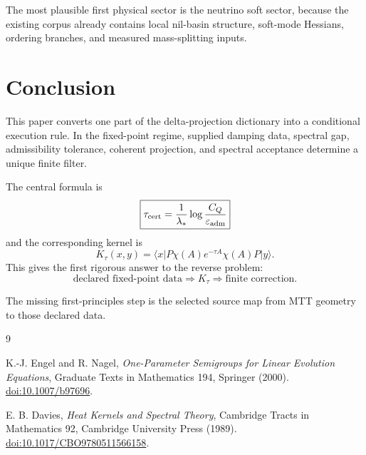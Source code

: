 \documentclass[11pt]{article}
\begin{document}
The most plausible first physical sector is the neutrino soft sector, because the existing corpus already contains local nil-basin structure, soft-mode Hessians, ordering branches, and measured mass-splitting inputs.

\section{Conclusion}

This paper converts one part of the delta-projection dictionary into a conditional execution
rule. In the fixed-point regime, supplied damping data, spectral gap, admissibility tolerance,
coherent projection, and spectral acceptance determine a unique finite filter.

The central formula is
\[
\boxed{
\tau_{\rm cert}
=
\frac{1}{\lambda_\ast}\log\frac{C_Q}{\varepsilon_{\rm adm}}
}
\]
and the corresponding kernel is
\[
\boxed{
K_{\tau}(x,y)
=
\big\langle x\big|P\chi(A)e^{-\tau A}\chi(A)P\big|y\big\rangle.
}
\]
This gives the first rigorous answer to the reverse problem:
\[
\boxed{
\text{declared fixed-point data}
\Rightarrow
K_{\tau}
\Rightarrow
\text{finite correction}.
}
\]

The missing first-principles step is the selected source map from MTT geometry to those
declared data.

\begin{thebibliography}{9}

K.-J. Engel and R. Nagel,
\emph{One-Parameter Semigroups for Linear Evolution Equations},
Graduate Texts in Mathematics 194, Springer (2000).
\href{https://doi.org/10.1007/b97696}{doi:10.1007/b97696}.

E. B. Davies,
\emph{Heat Kernels and Spectral Theory},
Cambridge Tracts in Mathematics 92, Cambridge University Press (1989).
\href{https://doi.org/10.1017/CBO9780511566158}{doi:10.1017/CBO9780511566158}.

\end{thebibliography}
\end{document}

